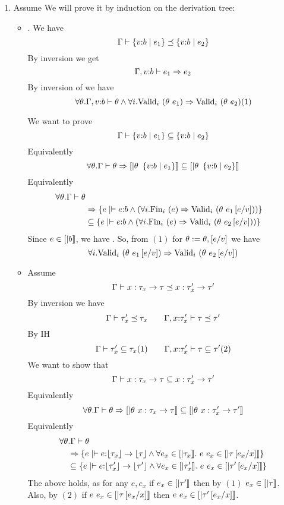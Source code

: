 \begin{enumerate}
\item \label{proof:ssub} Assume  
We will prove it by induction on the derivation tree:
\begin{itemize}
\item\rsubbase. We have
$$\issubtype{\Gamma}{\tref{v}{b}{e_1}}{\tref{v}{b}{e_2}}$$
By inversion we get 
$$\issubref{\Gamma, v\colon b}{e_1}{e_2}$$
By inversion of \rimpl we have
$$	\forall \theta. \iswellformed{\Gamma, v\colon b}{\theta} \land
	\generalconditionImpl{\theta\ e_1}{\theta\ e_2}
(1)$$

We want to prove 
$$\sissubtype{\Gamma}{\tref{v}{b}{e_1}}{\tref{v}{b}{e_2}}$$
Equivalently
$$	
	\forall \theta . \iswellformed{\Gamma}{\theta} \Rightarrow 
	\interp{\theta\ \tref{v}{b}{e_1}} \subseteq \interp{\theta\ \tref{v}{b}{e_2}}
$$
Equivalently
\begin{align*}
	\forall \theta . \iswellformed{\Gamma}{\theta} \\& \Rightarrow 
		\{e \mid \hastype{}{e}{b} 
 			\land 
			\generalconditionInterp{e}{\theta\ e_1\sub{v}{e}} 
		\}	
	\\& \subseteq 
		\{e \mid \hastype{}{e}{b} 
			\land 
			\generalconditionInterp{e}{\theta\ e_2\sub{v}{e}}
		 \}	
\end{align*}
Since $e \in \interp{b}$, we have .
So, from $(1)$ for $\theta := \theta,\sub{v}{e}$
we have 
$$	
	\generalconditionImpl{\theta\ e_1\sub{v}{e}}{\theta\ e_2\sub{v}{e}}
$$

\item\rsubfun Assume
$$\issubtype{\Gamma}{x:\tau_x \rightarrow \tau}{x:\tau'_x \rightarrow \tau'}$$
By inversion we have
$$	\issubtype{\Gamma}{\tau'_x}{\tau_x} \qquad
	\issubtype{\Gamma, x \colon \tau'_x}{\tau}{\tau'}
$$
By IH
$$	\sissubtype{\Gamma}{\tau'_x}{\tau_x} (1) \qquad
	\sissubtype{\Gamma, x \colon \tau'_x}{\tau}{\tau'} (2)
$$
We want to show that 
$$\sissubtype{\Gamma}{x:\tau_x \rightarrow \tau}{x:\tau'_x \rightarrow \tau'}$$
Equivalently
$$	
	\forall \theta . \iswellformed{\Gamma}{\theta} \Rightarrow 
	\interp{\theta\ x:\tau_x \rightarrow \tau} 
	\subseteq 
	\interp{\theta\ x:\tau'_x \rightarrow \tau'}
$$
Equivalently
\begin{align*}
	\forall \theta &. \iswellformed{\Gamma}{\theta} \\&\Rightarrow 
	\{e \mid \hastype{}{e}{\erase{\tau_x} \rightarrow \erase{\tau}} 
	\land 
	\forall e_x \in \interp{\tau_x}. \
	 \eapp{e}{e_x} \in \interp{\tau\sub{x}{e_x}} 
	 \}\\ &
	\subseteq 
	\{e \mid \hastype{}{e}{\erase{\tau'_x} \rightarrow \erase{\tau'}} 
	\land 
	\forall e_x \in \interp{\tau'_x}. \
	 \eapp{e}{e_x} \in \interp{\tau'\sub{x}{e_x}} 
	 \}
\end{align*}
The above holds, as for any $e, e_x$
if $e_x \in \interp{\tau'}$
then by $(1)$
$e_x \in \interp{\tau}$.
Also, by $(2)$
if $\eapp{e}{e_x} \in \interp{\tau\sub{x}{e_x}}$
then
$\eapp{e}{e_x} \in \interp{\tau'\sub{x}{e_x}}$.
\end{itemize}
 

\end{enumerate}
